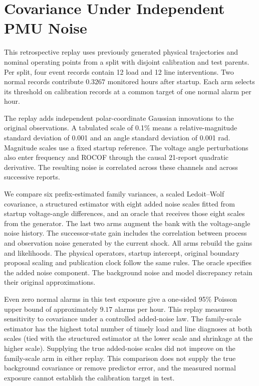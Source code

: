 \section{Covariance Under Independent PMU Noise}
\label{app:oracle-pmu-covariance}
This retrospective replay uses previously generated physical trajectories
and nominal operating points from a split with disjoint calibration and test parents.
Per split, four event records contain 12 load and 12 line interventions.
Two normal records contribute $0.3267$ monitored hours after startup.
Each arm selects its threshold on calibration records at a common
target of one normal alarm per hour.

The replay adds independent polar-coordinate Gaussian innovations to
the original observations. A tabulated scale of 0.1\% means a relative-magnitude standard
deviation of 0.001 and an angle standard deviation of 0.001 rad. Magnitude scales use a fixed startup reference. The voltage
angle perturbations also enter frequency and ROCOF through the causal
21-report quadratic derivative. The resulting noise is correlated
across these channels and across successive reports.

We compare six prefix-estimated family variances, a scaled
Ledoit--Wolf covariance, a structured estimator with eight added
noise scales fitted from startup voltage-angle differences, and an
oracle that receives those eight scales from the generator.
The last two arms augment the bank with the voltage-angle noise
history. The successor-state gain includes the correlation between
process and observation noise generated by the current shock.
All arms rebuild the gains and likelihoods. The physical operators,
startup intercept, original boundary proposal scaling and publication
clock follow the same rules. The oracle specifies the added noise
component. The background noise and model discrepancy retain
their original approximations.

\begin{table}[t]\centering\small
\caption{Independent PMU noise replay on previously generated test parents.
Load and line entries count correct attribution before restoration.
Extras are unmatched alarms in event records. Normal is the alarm count
in $0.3267$ monitored hours for each arm.}
\label{tab:oracle-pmu-covariance}
\setlength{\tabcolsep}{3.4pt}

\end{table}

Even zero normal alarms in this test exposure give a one-sided 95\%
Poisson upper bound of approximately $9.17$ alarms per hour. This
replay measures sensitivity to covariance under a controlled added-noise
law. The family-scale estimator has the highest total number of timely load and line diagnoses at
both scales (tied with the structured estimator at the lower scale and
shrinkage at the higher scale). Supplying the true added-noise scales
did not improve on the family-scale arm in either replay. This comparison
does not supply the true background covariance or remove predictor error,
and the measured normal exposure cannot establish the calibration target
in test.
